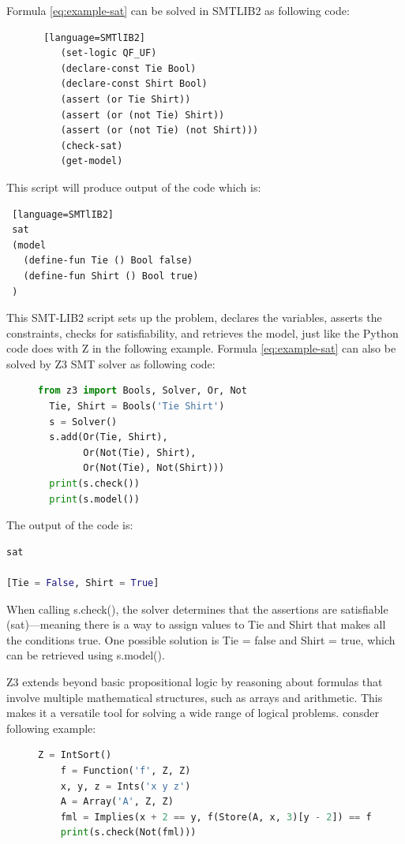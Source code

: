 \documentclass[]{rptuseminar}
\begin{document}
Formula \ref{eq:example-sat} can be solved in SMTLIB2 as following code:

\begin{figure}[ht]
  \begin{lstlisting} [language=SMTlIB2]
    (set-logic QF_UF)
    (declare-const Tie Bool)
    (declare-const Shirt Bool)
    (assert (or Tie Shirt))
    (assert (or (not Tie) Shirt))
    (assert (or (not Tie) (not Shirt)))
    (check-sat)
    (get-model)
  \end{lstlisting}
  \end{figure}

  This script will produce output of the code which is:
\begin{lstlisting} [language=SMTlIB2]
 sat
 (model
   (define-fun Tie () Bool false)
   (define-fun Shirt () Bool true)
 )
\end{lstlisting}
\vspace{1em}

  This SMT-LIB2 script sets up the problem, declares the variables, asserts the constraints, checks for satisfiability, and retrieves the model, just like the Python code does with Z in the following example. Formula \ref{eq:example-sat} can also be solved by Z3 SMT solver as following code:

\begin{figure}[ht]
\begin{lstlisting}[language=Python]
  from z3 import Bools, Solver, Or, Not
  Tie, Shirt = Bools('Tie Shirt')
  s = Solver()
  s.add(Or(Tie, Shirt),
        Or(Not(Tie), Shirt),
        Or(Not(Tie), Not(Shirt)))
  print(s.check())
  print(s.model())
\end{lstlisting}
\end{figure}

\vspace{1em}
The output of the code is:
\begin{lstlisting}[language=Python]
sat

[Tie = False, Shirt = True]
\end{lstlisting}
\vspace{1em}


When calling s.check(), the solver determines that the assertions are satisfiable (sat)—meaning there is a way to assign values to Tie and Shirt that makes all the conditions true. One possible solution is Tie = false and Shirt = true, which can be retrieved using s.model().
\vspace{1em}

Z3 extends beyond basic propositional logic by reasoning about formulas that involve multiple mathematical structures, such as arrays and arithmetic. This makes it a versatile tool for solving a wide range of logical problems. consder following example:
\begin{figure}[ht]
  \begin{lstlisting}[language=Python]
    Z = IntSort()
    f = Function('f', Z, Z)
    x, y, z = Ints('x y z')
    A = Array('A', Z, Z)
    fml = Implies(x + 2 == y, f(Store(A, x, 3)[y - 2]) == f(y - x + 1))
    print(s.check(Not(fml)))
  \end{lstlisting}
  \end{figure}
  
\end{document}
